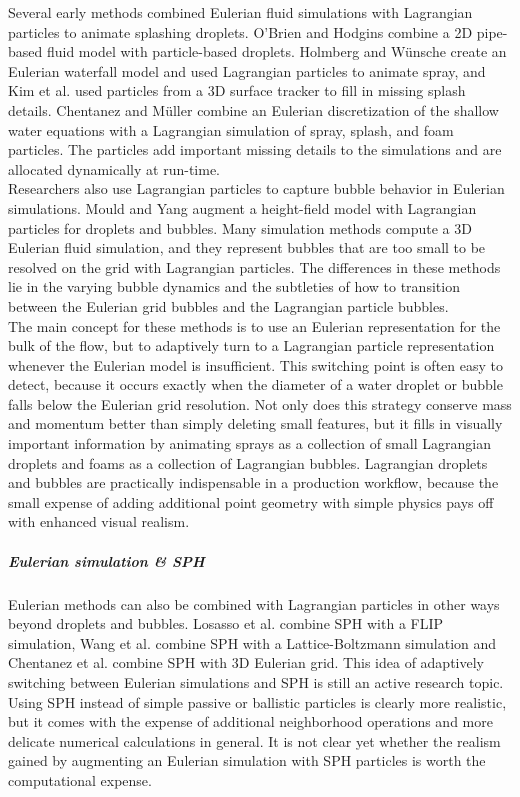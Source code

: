 Several early methods combined Eulerian fluid simulations with Lagrangian particles to animate splashing droplets. O'Brien and Hodgins \cite{OBrien1995} combine a 2D pipe-based fluid model with particle-based droplets. Holmberg and W\"unsche \cite{Holmberg2004} create an Eulerian waterfall model and used Lagrangian particles to animate spray, and Kim et al. \cite{Kim2006:Splash} used particles from a 3D surface tracker to fill in missing splash details. Chentanez and M\"uller \cite{Chentanez2010} combine an Eulerian discretization of the shallow water equations with a Lagrangian simulation of spray, splash, and foam particles. The particles add important missing details to the simulations and are allocated dynamically at run-time.
\\
Researchers also use Lagrangian particles to capture bubble behavior in Eulerian simulations. Mould and Yang \cite{Mould1997} augment a height-field model with Lagrangian particles for droplets and bubbles. Many simulation methods \cite{Greenwood:2004:BBE:1028523.1028562,Hong2008Bubbles,Patkar2013} compute a 3D Eulerian fluid simulation, and they represent bubbles that are too small to be resolved on the grid with Lagrangian particles. The differences in these methods lie in the varying bubble dynamics and the subtleties of how to transition between the Eulerian grid bubbles and the Lagrangian particle bubbles.
\\
The main concept for these methods is to use an Eulerian representation for the bulk of the flow, but to adaptively turn to a Lagrangian particle representation whenever the Eulerian model is insufficient. This switching point is often easy to detect, because it occurs exactly when the diameter of a water droplet or bubble falls below the Eulerian grid resolution. Not only does this strategy conserve mass and momentum better than simply deleting small features, but it fills in visually important information by animating sprays as a collection of small Lagrangian droplets and foams as a collection of Lagrangian bubbles. Lagrangian droplets and bubbles are practically indispensable in a production workflow, because the small expense of adding additional point geometry with simple physics pays off with enhanced visual realism.

\subparagraph*{Eulerian simulation \& SPH}
Eulerian methods can also be combined with Lagrangian particles in other ways beyond droplets and bubbles.
Losasso et al. \cite{Losasso2008} combine SPH with a FLIP simulation, Wang et al. \cite{Wang2013} combine SPH with a Lattice-Boltzmann simulation and Chentanez et al. \cite{Chentanez2014} combine SPH with 3D Eulerian grid.
This idea of adaptively switching between Eulerian simulations and SPH is still an active research topic. Using SPH instead of simple passive or ballistic particles is clearly more realistic, but it comes with the expense of additional neighborhood operations and more delicate numerical calculations in general. It is not clear yet whether the realism gained by augmenting an Eulerian simulation with SPH particles is worth the computational expense.

